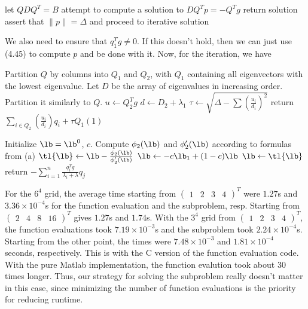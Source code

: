 \documentclass{article}
\newcommand{\ep}{\epsilon}
\newcommand{\openm}{\begin{pmatrix}}
\newcommand{\closem}{\end{pmatrix}}
\begin{document}
\begin{algorithmic}
    \State let $QDQ^T=B$
        \State attempt to compute a solution to $DQ^Tp=-Q^Tg$
                \State return solution
            \EndIf
        \EndIf
    \EndIf
    \State assert that $\|p\|=\Delta$ and proceed to iterative solution
\end{algorithmic}

We also need to ensure that $q_1^Tg\neq0$. If this doesn't hold, then we can just use (4.45) to compute $p$ and be done with it. Now, for the iteration, we have

\begin{algorithmic}
    \State Partition $Q$ by columns into $Q_1$ and $Q_2$, with $Q_1$ containing all eigenvectors with the lowest eigenvalue.
    \State Let $D$ be the array of eigenvalues in increasing order. Partition it similarly to $Q$.
        \State $u\gets Q_2^Tg$
        \State $d\gets D_2+\lambda_1$
        \State $\tau\gets\sqrt{\Delta-\sum\left(\frac{u_i}{d_i}\right)^2}$
        \State return $\sum_{i\in Q_2}\left(\frac{u_i}{d_i}\right)q_i+\tau Q_1(1)$
    \EndIf

    \State Initialize $\lb=\lb^0$, $c$.
    \While{$|\phi_2(\lb)|>\ep$}
        \State Compute $\phi_2(\lb)$ and $\phi_2'(\lb)$ according to formulas from (a)
        \State $\tl{\lb}\gets\lb-\frac{\phi_2(\lb)}{\phi_2'(\lb)}$
            \State $\lb\gets-c\lb_1+(1-c)\lb$
        \Else
            \State $\lb\gets\tl{\lb}$
        \EndIf
    \EndWhile
    \State return $-\sum_{i=1}^n\frac{q_i^Tg}{\lambda_i+\lambda}q_j$
\end{algorithmic}
For the $6^4$ grid, the average time starting from $\openm1&2&3&4\closem^T$ were $1.27$s and $3.36\times10^{-4}$s for the function evaluation and the subproblem, resp. Starting from $\openm2&4&8&16\closem^T$ gives $1.27$s and $1.74$s. With the $3^4$ grid from $\openm1&2&3&4\closem^T$, the function evaluations took $7.19\times10^{-3}$s and the subproblem took $2.24\times10^{-4}$s. Starting from the other point, the times were $7.48\times10^{-3}$ and $1.81\times10^{-4}$ seconds, respectively. This is with the C version of the function evaluation code. With the pure Matlab implementation, the function evalution took about 30 times longer. Thus, our strategy for solving the subproblem really doesn't matter in this case, since minimizing the number of function evaluations is the priority for reducing runtime.
\end{document}
